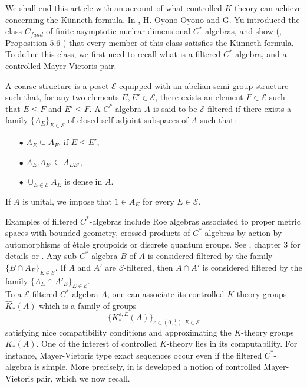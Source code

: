 We shall end this article with an account of what controlled $K$-theory can achieve concerning the Künneth formula. In \cite{OY4}, H. Oyono-Oyono and G. Yu introduced the class $C_{fand}$ of finite asymptotic nuclear dimensional $C^*$-algebras, and show (\cite{OY4}, Proposition $5.6$ ) that every member of this class satisfies the Künneth formula. To define this class, we first need to recall what is a filtered $C^*$-algebra, and a controlled Mayer-Vietoris pair.

\begin{definition}
A coarse structure is a poset $\mathcal E$ equipped with an abelian semi group structure such that, for any two elements $E,E'\in \mathcal E$, there exists an element $F\in \mathcal E$ such that $E\leq F$ and $E'\leq F$. A $C^*$-algebra $A$ is said to be $\mathcal E$-filtered if there exists a family $\{A_E \}_{E\in \mathcal E}$ of closed self-adjoint subspaces of $A$ such that:
\begin{itemize}
\item[$\bullet$] $A_E \subseteq A_{E'}$ if $E\leq E'$,
\item[$\bullet$] $A_E . A_{E'} \subseteq A_{EE'}$,
\item[$\bullet$] $\cup_{E\in \mathcal E} A_E$ is dense in $A$.
\end{itemize} 
If $A$ is unital, we impose that $1\in A_E$ for every $E\in \mathcal E$.
\end{definition} 

Examples of filtered $C^*$-algebras include Roe algebras associated to proper metric spaces with bounded geometry, crossed-products of $C^*$-algebras by action by automorphisms of \'etale groupoids or discrete quantum groups. See \cite{DellAieraThesis}, chapter $3$ for details or \cite{dell2017controlled}. Any sub-$C^*$-algebra $B$ of $A$ is considered filtered by the family $\{B\cap A_E\}_{E\in \mathcal E}$. If $A$ and $A'$ are $\mathcal E$-filtered, then $A\cap A'$ is considered filtered by the family $\{A_E\cap A'_E\}_{E\in \mathcal E}$. \\

To a $\mathcal E$-filtered $C^*$-algebra $A$, one can associate its controlled $K$-theory groups $\hat K_*(A)$ which is a family of groups 
\[\{ K^{\varepsilon, E}_*(A)\}_{\varepsilon\in (0, \frac{1}{4}), E\in \mathcal E}\] 
satisfying nice compatibility conditions and approximating the $K$-theory groups $K_*(A)$. One of the interest of controlled $K$-theory lies in its computability. For instance, Mayer-Vietoris type exact sequences occur even if the filtered $C^*$-algebra is simple. More precisely, in \cite{OY4} is developed a notion of controlled Mayer-Vietoris pair, which we now recall.

